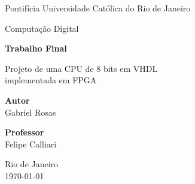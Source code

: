 \begin{titlepage}
\centering
{\large Pontifícia Universidade Católica do Rio de Janeiro\par}
\vspace{0.4cm}
{\large Computação Digital\par}

\vspace{4cm}
{\Huge\bfseries Trabalho Final\par}
\vspace{0.6cm}
{\LARGE Projeto de uma CPU de 8 bits em VHDL\\[0.2cm] implementada em FPGA\par}

\vspace{3cm}
{\large\textbf{Autor}\\[0.2cm]
Gabriel Rosas\par}

\vspace{1.2cm}
{\large\textbf{Professor}\\[0.2cm]
Felipe Calliari\par}

\vfill
{\large Rio de Janeiro\\ \today\par}
\end{titlepage}
